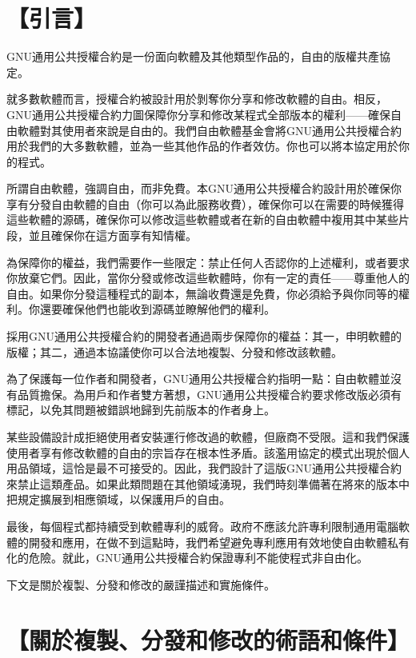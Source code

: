 \section{【引言】}
GNU通用公共授權合約是一份面向軟體及其他類型作品的，自由的版權共產協定。\par
就多數軟體而言，授權合約被設計用於剝奪你分享和修改軟體的自由。相反，GNU通用公共授權合約力圖保障你分享和修改某程式全部版本的權利——確保自由軟體對其使用者來說是自由的。我們自由軟體基金會將GNU通用公共授權合約用於我們的大多數軟體，並為一些其他作品的作者效仿。你也可以將本協定用於你的程式。\par
所謂自由軟體，強調自由，而非免費。本GNU通用公共授權合約設計用於確保你享有分發自由軟體的自由（你可以為此服務收費），確保你可以在需要的時候獲得這些軟體的源碼，確保你可以修改這些軟體或者在新的自由軟體中複用其中某些片段，並且確保你在這方面享有知情權。\par
為保障你的權益，我們需要作一些限定：禁止任何人否認你的上述權利，或者要求你放棄它們。因此，當你分發或修改這些軟體時，你有一定的責任——尊重他人的自由。如果你分發這種程式的副本，無論收費還是免費，你必須給予與你同等的權利。你還要確保他們也能收到源碼並瞭解他們的權利。\par
採用GNU通用公共授權合約的開發者通過兩步保障你的權益：其一，申明軟體的版權；其二，通過本協議使你可以合法地複製、分發和修改該軟體。\par
為了保護每一位作者和開發者，GNU通用公共授權合約指明一點：自由軟體並沒有品質擔保。為用戶和作者雙方著想，GNU通用公共授權合約要求修改版必須有標記，以免其問題被錯誤地歸到先前版本的作者身上。\par
某些設備設計成拒絕使用者安裝運行修改過的軟體，但廠商不受限。這和我們保護使用者享有修改軟體的自由的宗旨存在根本性矛盾。該濫用協定的模式出現於個人用品領域，這恰是最不可接受的。因此，我們設計了這版GNU通用公共授權合約來禁止這類產品。如果此類問題在其他領域湧現，我們時刻準備著在將來的版本中把規定擴展到相應領域，以保護用戶的自由。\par
最後，每個程式都持續受到軟體專利的威脅。政府不應該允許專利限制通用電腦軟體的開發和應用，在做不到這點時，我們希望避免專利應用有效地使自由軟體私有化的危險。就此，GNU通用公共授權合約保證專利不能使程式非自由化。\par
下文是關於複製、分發和修改的嚴謹描述和實施條件。
\section{【關於複製、分發和修改的術語和條件】}
